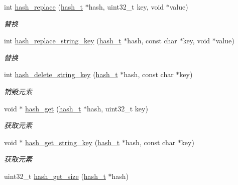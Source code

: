 \begin{DoxyCompactItemize}
int \hyperlink{a00056_a8a53c52f3e2efedc73073989a69aaa7f_a8a53c52f3e2efedc73073989a69aaa7f}{hash\+\_\+replace} (\hyperlink{a00047_a188677c3015513590ab998e96b999966_a188677c3015513590ab998e96b999966}{hash\+\_\+t} $\ast$hash, uint32\+\_\+t key, void $\ast$value)
\begin{DoxyCompactList}\small\item\em 替换 \end{DoxyCompactList}\item 
int \hyperlink{a00056_a204a56cd4efe339f71796a44830e8162_a204a56cd4efe339f71796a44830e8162}{hash\+\_\+replace\+\_\+string\+\_\+key} (\hyperlink{a00047_a188677c3015513590ab998e96b999966_a188677c3015513590ab998e96b999966}{hash\+\_\+t} $\ast$hash, const char $\ast$key, void $\ast$value)
\begin{DoxyCompactList}\small\item\em 替换 \end{DoxyCompactList}\item 
int \hyperlink{a00056_af31ceed9b3d6675a240da0b952492a0c_af31ceed9b3d6675a240da0b952492a0c}{hash\+\_\+delete\+\_\+string\+\_\+key} (\hyperlink{a00047_a188677c3015513590ab998e96b999966_a188677c3015513590ab998e96b999966}{hash\+\_\+t} $\ast$hash, const char $\ast$key)
\begin{DoxyCompactList}\small\item\em 销毁元素 \end{DoxyCompactList}\item 
void $\ast$ \hyperlink{a00056_a8f5065a1ac13afbbec3e2c61355effe3_a8f5065a1ac13afbbec3e2c61355effe3}{hash\+\_\+get} (\hyperlink{a00047_a188677c3015513590ab998e96b999966_a188677c3015513590ab998e96b999966}{hash\+\_\+t} $\ast$hash, uint32\+\_\+t key)
\begin{DoxyCompactList}\small\item\em 获取元素 \end{DoxyCompactList}\item 
void $\ast$ \hyperlink{a00056_a34b1caad9530537c6049ba7090d105a7_a34b1caad9530537c6049ba7090d105a7}{hash\+\_\+get\+\_\+string\+\_\+key} (\hyperlink{a00047_a188677c3015513590ab998e96b999966_a188677c3015513590ab998e96b999966}{hash\+\_\+t} $\ast$hash, const char $\ast$key)
\begin{DoxyCompactList}\small\item\em 获取元素 \end{DoxyCompactList}\item 
uint32\+\_\+t \hyperlink{a00056_a161be6f6ab6de6db3a3a0c3f82ce1607_a161be6f6ab6de6db3a3a0c3f82ce1607}{hash\+\_\+get\+\_\+size} (\hyperlink{a00047_a188677c3015513590ab998e96b999966_a188677c3015513590ab998e96b999966}{hash\+\_\+t} $\ast$hash)

\end{DoxyCompactItemize}
